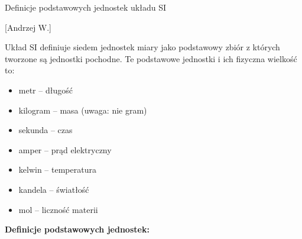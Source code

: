 \documentclass{article}
\begin{document}
\begin{enumerate}
\begin{itemize}
\end{itemize}



















{\Large \bf  \item Definicje podstawowych jednostek układu SI} [Andrzej W.]

Układ SI definiuje siedem jednostek miary jako podstawowy zbiór z których tworzone są jednostki pochodne. Te podstawowe jednostki i ich fizyczna wielkość to:
\begin{itemize}
\item    metr – długość
\item     kilogram – masa (uwaga: nie gram)
\item     sekunda – czas
\item     amper – prąd elektryczny
\item     kelwin – temperatura
\item     kandela – światłość
\item     mol – liczność materii
\end{itemize}

{\bf Definicje podstawowych jednostek:}


\end{enumerate}
\end{document}
